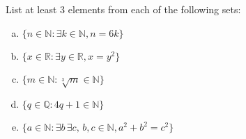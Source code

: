 \documentclass[11pt,letterpaper]{article}
\begin{document}

 List at least 3 elements from each of the following sets:
        \begin{enumerate}[(a)]
        \item $\{ n \in \mathbb{N} \colon \exists k \in \mathbb{N}, n= 6k \}$
        \item $\{ x \in \mathbb{R} \colon \exists y \in \mathbb{R}, x= y^2 \}$
        \item $\{ m \in \mathbb{N} \colon \sqrt[3]{m} \in \mathbb{N} \}$
        \item $\{ q \in \mathbb{Q} \colon 4q + 1 \in \mathbb{N} \}$
        \item $\{ a \in \mathbb{N} \colon \exists b\, \exists c,\, b, c \in \mathbb{N}, a^2 + b^2= c^2 \}$
        \end{enumerate} 
\end{document}

